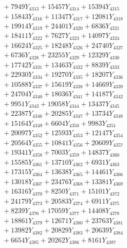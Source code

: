 \documentclass[a4paper,10pt]{article}
\begin{document}
{\begin{align}
&\;  + 7949 Y_{4313} + 15457 Y_{4314} + 15394 Y_{4315} \\[0.3ex]
&\;  + 15843 Y_{4316} + 11347 Y_{4317} + 12081 Y_{4318} \\[0.5ex]\allowbreak
&\;  + 19914 Y_{4319} + 24401 Y_{4320} + 6836 Y_{4321} \\[0.3ex]
&\;  + 18411 Y_{4322} + 7627 Y_{4323} + 14097 Y_{4324} \\[0.3ex]
&\;  + 16624 Y_{4325} + 18248 Y_{4326} + 24740 Y_{4327} \\[0.3ex]
&\;  + 6736 Y_{4328} + 23255 Y_{4329} + 12329 Y_{4330} \\[0.3ex]
&\;  + 17742 Y_{4331} + 13463 Y_{4332} + 8839 Y_{4333} \\[0.3ex]
&\;  + 22930 Y_{4334} + 19270 Y_{4335} + 18207 Y_{4336} \\[0.3ex]
&\;  + 10588 Y_{4337} + 15619 Y_{4338} + 14669 Y_{4339} \\[0.3ex]
&\;  + 24704 Y_{4340} + 18036 Y_{4341} + 14187 Y_{4342} \\[0.3ex]
&\;  + 9951 Y_{4343} + 19058 Y_{4344} + 13437 Y_{4345} \\[0.3ex]
&\;  + 22387 Y_{4346} + 20285 Y_{4347} + 13734 Y_{4348} \\[0.5ex]\allowbreak
&\;  + 15164 Y_{4349} + 6604 Y_{4350} + 9983 Y_{4351} \\[0.3ex]
&\;  + 20097 Y_{4352} + 12593 Y_{4353} + 12147 Y_{4354} \\[0.3ex]
&\;  + 20564 Y_{4355} + 10841 Y_{4356} + 20609 Y_{4357} \\[0.3ex]
&\;  + 19341 Y_{4358} + 7003 Y_{4359} + 14837 Y_{4360} \\[0.3ex]
&\;  + 15585 Y_{4361} + 13710 Y_{4362} + 6931 Y_{4363} \\[0.3ex]
&\;  + 17315 Y_{4364} + 13638 Y_{4365} + 14461 Y_{4366} \\[0.3ex]
&\;  + 13018 Y_{4367} + 23476 Y_{4368} + 13381 Y_{4369} \\[0.3ex]
&\;  + 16316 Y_{4370} + 8250 Y_{4371} + 15101 Y_{4372} \\[0.3ex]
&\;  + 24179 Y_{4373} + 20583 Y_{4374} + 6911 Y_{4375} \\[0.3ex]
&\;  + 8239 Y_{4376} + 17059 Y_{4377} + 14408 Y_{4378} \\[0.5ex]\allowbreak
&\;  + 18861 Y_{4379} + 12671 Y_{4380} + 23763 Y_{4381} \\[0.3ex]
&\;  + 13982 Y_{4382} + 20829 Y_{4383} + 20639 Y_{4384} \\[0.3ex]
&\;  + 6654 Y_{4385} + 20262 Y_{4386} + 8161 Y_{4387} \\[0.3ex]

\end{align}}
\end{document}
